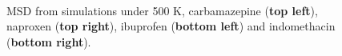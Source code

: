 \begin{figure}[H]
	\centering
	\\
	\caption{MSD from simulations under 500 K, carbamazepine (\textbf{top left}), naproxen (\textbf{top right}), ibuprofen (\textbf{bottom left}) and indomethacin (\textbf{bottom right}).}
	\label{fig:msd_r2}    
\end{figure}
